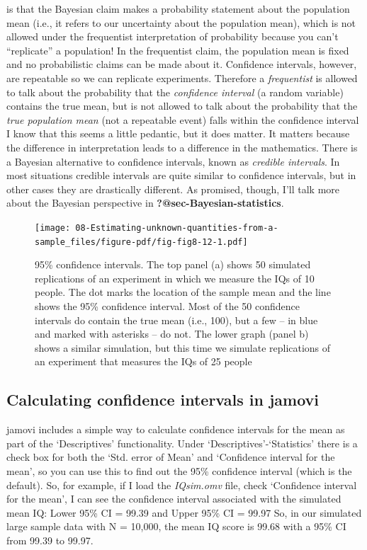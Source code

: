 \documentclass[
  a4paper,
]{book}
\begin{document}
is that the Bayesian claim makes a probability statement about the
population mean (i.e., it refers to our uncertainty about the population
mean), which is not allowed under the frequentist interpretation of
probability because you can't ``replicate'' a population! In the
frequentist claim, the population mean is fixed and no probabilistic
claims can be made about it. Confidence intervals, however, are
repeatable so we can replicate experiments. Therefore a
\emph{frequentist} is allowed to talk about the probability that the
\emph{confidence interval} (a random variable) contains the true mean,
but is not allowed to talk about the probability that the \emph{true
population mean} (not a repeatable event) falls within the confidence
interval I know that this seems a little pedantic, but it does matter.
It matters because the difference in interpretation leads to a
difference in the mathematics. There is a Bayesian alternative to
confidence intervals, known as \emph{credible intervals}. In most
situations credible intervals are quite similar to confidence intervals,
but in other cases they are drastically different. As promised, though,
I'll talk more about the Bayesian perspective in
\textbf{?@sec-Bayesian-statistics}.

\begin{figure}

\texttt{[image: 08-Estimating-unknown-quantities-from-a-sample\_files/figure-pdf/fig-fig8-12-1.pdf]} \hfill{}

\caption{\label{fig-fig8-12}95\% confidence intervals. The top panel (a)
shows 50 simulated replications of an experiment in which we measure the
IQs of 10 people. The dot marks the location of the sample mean and the
line shows the 95\% confidence interval. Most of the 50 confidence
intervals do contain the true mean (i.e., 100), but a few -- in blue and
marked with asterisks -- do not. The lower graph (panel b) shows a
similar simulation, but this time we simulate replications of an
experiment that measures the IQs of 25 people}

\end{figure}

\hypertarget{calculating-confidence-intervals-in-jamovi}{%
\subsection{Calculating confidence intervals in
jamovi}\label{calculating-confidence-intervals-in-jamovi}}

jamovi includes a simple way to calculate confidence intervals for the
mean as part of the `Descriptives' functionality. Under
`Descriptives'-`Statistics' there is a check box for both the `Std.
error of Mean' and `Confidence interval for the mean', so you can use
this to find out the 95\% confidence interval (which is the default).
So, for example, if I load the \emph{IQsim.omv} file, check `Confidence
interval for the mean', I can see the confidence interval associated
with the simulated mean IQ: Lower 95\% CI = 99.39 and Upper 95\% CI =
99.97 So, in our simulated large sample data with N = 10,000, the mean
IQ score is 99.68 with a 95\% CI from 99.39 to 99.97.
\end{document}
